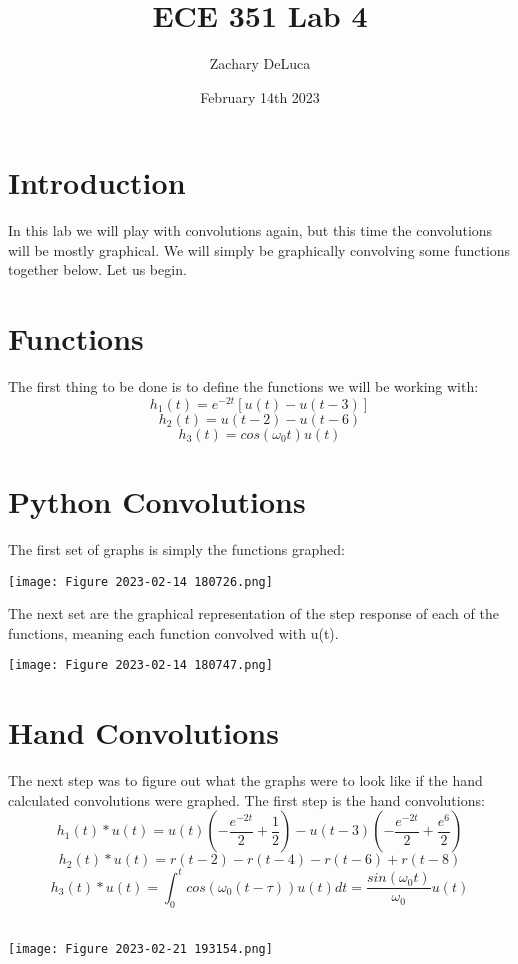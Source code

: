\documentclass[12pt,a4paper]{article}
\title{ECE 351 Lab 4}
\author{Zachary DeLuca  }
\date{February 14th 2023}
\begin{document}
\maketitle
\hline
\section{Introduction}
In this lab we will play with convolutions again, but this time the convolutions will be mostly graphical. We will simply be graphically convolving some functions together below. Let us begin. 
\section{Functions }
The first thing to be done is to define the functions we will be working with: 
$$h_1(t) = e^{-2t}[u(t)-u(t-3)]$$
$$h_2(t) = u(t-2)-u(t-6)$$
$$h_3(t)=cos(\omega_0t)u(t)$$

\section{Python Convolutions}
The first set of graphs is simply the functions graphed: \\ \vspace{24pt}
\begin{center}
\texttt{[image: Figure 2023-02-14 180726.png]}
\\ \vspace{24pt}
\end{center}

The next set are the graphical representation of the step response of each of the functions, meaning each function convolved with u(t). \\
\begin{center}
\texttt{[image: Figure 2023-02-14 180747.png]}
\end{center}
\section{Hand Convolutions}
The next step was to figure out what the graphs were to look like if the hand calculated convolutions were graphed. The first step is the hand convolutions: \\
$$h_1(t)*u(t) = u(t)(-\frac{e^{-2t}}{2}+\frac{1}{2})-u(t-3)(-\frac{e^{-2t}}{2}+\frac{e^6}{2})$$
$$h_2(t)*u(t) = r(t-2)-r(t-4)-r(t-6)+r(t-8)$$
$$h_3(t)*u(t) = \int_0^t{cos(\omega_0(t-\tau))u(t)}dt = \frac{sin(\omega_0t)}{\omega_0}u(t)$$\\
\begin{center}
\texttt{[image: Figure 2023-02-21 193154.png]}
\end{center}
\end{document}
